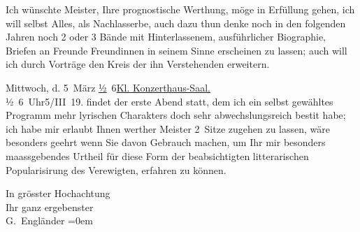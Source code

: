 \pstart
           Ich wünschte Meister, Ihre prognostische Werthung, möge in Erfüllung gehen, ich will
               selbst Alles, als Nachlasserbe, auch dazu thun {\kaufmannsund} denke
               noch in den folgenden Jahren noch 2 oder 3 {\pb}Bände mit
               Hinterlassenem, ausführlicher Biographie, Briefen an Freunde {\kaufmannsund} Freundinnen in seinem Sinne erscheinen zu lassen; auch
               will ich durch Vorträge den Kreis der ihn Verstehenden erweitern.\pend
           
\pstart
           Mittwoch, d. 5 März{ }\uline{½} 6\noindent{}\uline{Kl. Konzerthaus-Saal.}{\\}½ 6 Uhr\hspace*{1em}5/III 19. findet der erste Abend statt, dem ich ein selbst gewähltes Programm mehr
               lyrischen Charakters {\kaufmannsund} doch sehr abwechslungsreich
                  besti{\geminationm}t habe; ich habe mir erlaubt Ihnen werther
               Meister 2 Sitze zugehen zu lassen, wäre besonders geehrt wenn Sie davon Gebrauch
               machen, um Ihr mir besonders maassgebendes Urtheil für diese Form der beabsichtigten
               litterarischen Popularisirung des Verewigten, erfahren zu können.\pend
           
\pstart
           In grösster Hochachtung{\\[\baselineskip]}Ihr ganz ergebenster{\\[\baselineskip]}\spacefill\mbox{G. Engländer}\pend
           \leftskip=0em{}\endnumbering{}  
      